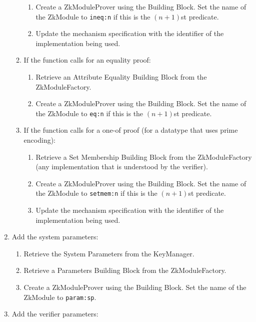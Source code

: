 \begin{enumerate}
\begin{enumerate}
\begin{enumerate}
              \item Create a ZkModuleProver using the Building Block. Set the name of the ZkModule to
                \texttt{ineq:n} if this is the $(n+1)$st predicate.
              \item Update the mechanism specification with the identifier of the implementation being used.
            \end{enumerate}
          \item If the function calls for an equality proof:
            \begin{enumerate}
              \item Retrieve an Attribute Equality Building Block from the ZkModuleFactory.
              \item Create a ZkModuleProver using the Building Block. Set the name of the ZkModule to
                \texttt{eq:n} if this is the $(n+1)$st predicate.
            \end{enumerate}
          \item If the function calls for a one-of proof (for a datatype that uses prime encoding): \notimplemented
            \begin{enumerate}
              \item Retrieve a Set Membership Building Block from the ZkModuleFactory (any implementation that is understood by the verifier).
              \item Create a ZkModuleProver using the Building Block. Set the name of the ZkModule to
                \texttt{setmem:n} if this is the $(n+1)$st predicate.
              \item Update the mechanism specification with the identifier of the implementation being used.
            \end{enumerate}
        \end{enumerate}
      \item Add the system parameters:
        \begin{enumerate}
          \item Retrieve the System Parameters from the KeyManager.
          \item Retrieve a Parameters Building Block from the ZkModuleFactory.
          \item Create a ZkModuleProver using the Building Block. Set the name of the ZkModule to
            \texttt{param:sp}.
        \end{enumerate}
      \item Add the verifier parameters:
        \begin{enumerate}

\end{enumerate}
\end{enumerate}
